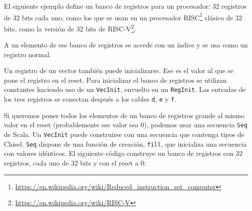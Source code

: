 \documentclass[%
    10pt,
    headinclude, footinclude=false,
    openright, %
    notitlepage,
    cleardoublepage=empty,
    headsepline,
    numbers=noenddot,
    bibliography=totoc, index=totoc,
    ]{scrbook}
\newcommand{\code}[1]{{\lstinline[basicstyle=\small\ttfamily]{#1}}}
\newcommand{\myref}[2]{\href{#1}{#2}}
\renewcommand{\myref}[2]{{#2}{\footnote{\url{#1}}}}
\begin{document}

El siguiente ejemplo define un banco de registros para un procesador: 32 registros
de 32 bits cada uno, como los que se usan en un procesador
\myref{https://en.wikipedia.org/wiki/Reduced_instruction_set_computer}{RISC}
clásico de 32 bits, como la versión de 32 bits de \myref{https://en.wikipedia.org/wiki/RISC-V}{RISC-V}.



\noindent A un elemento de ese banco de registros se accede con un índice y se usa como un registro normal.



Un registro de un vector también puede inicializarse. Ese es el valor al que se pone el registro en el reset.
Para inicializar el banco de registros se utilizan constantes haciendo uso de un \code{VecInit}, envuelto
en un \code{RegInit}. Las entradas de los tres registros se conectan después a los cables \code{d},
\code{e} y \code{f}.



Si queremos poner todos los elementos de un banco de registros grande al mismo valor en el reset
(probablemente ese valor sea 0), podemos usar una secuencia \code{Seq} de Scala. Un \code{VecInit} puede 
construirse con una secuencia que contenga tipos de Chisel. \code{Seq} dispone de una función de creación,
\code{fill}, que inicializa una secuencia con valores idénticos.
El siguiente código construye un banco de registros con 32 registros, cada uno de 32 bits y con
el reset a 0:
\end{document}
